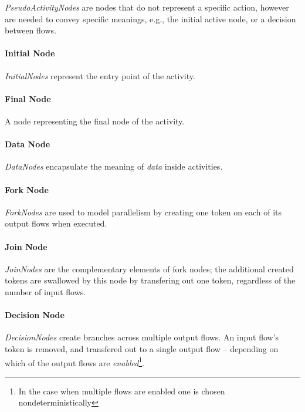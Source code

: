 \emph{PseudoActivityNodes} are nodes that do not represent a specific action, however are needed to convey specific meanings, e.g., the initial active node, or a decision between flows.

\paragraph{Initial Node}

\emph{InitialNodes} represent the entry point of the activity.

\paragraph{Final Node}

A node representing the final node of the activity.

\paragraph{Data Node}

\emph{DataNodes} encapsulate the meaning of \emph{data} inside activities.

\paragraph{Fork Node}

\emph{ForkNodes} are used to model parallelism by creating one token on each of its output flows when executed.

\paragraph{Join Node}

\emph{JoinNodes} are the complementary elements of fork nodes; the additional created tokens are swallowed by this node by transfering out one token, regardless of the number of input flows.

\paragraph{Decision Node}

\emph{DecisionNodes} create branches across multiple output flows. An input flow's token is removed, and transfered out to a single output flow -- depending on which of the output flows are \emph{enabled}\footnote{In the case when multiple flows are enabled one is chosen nondeterministically}.


